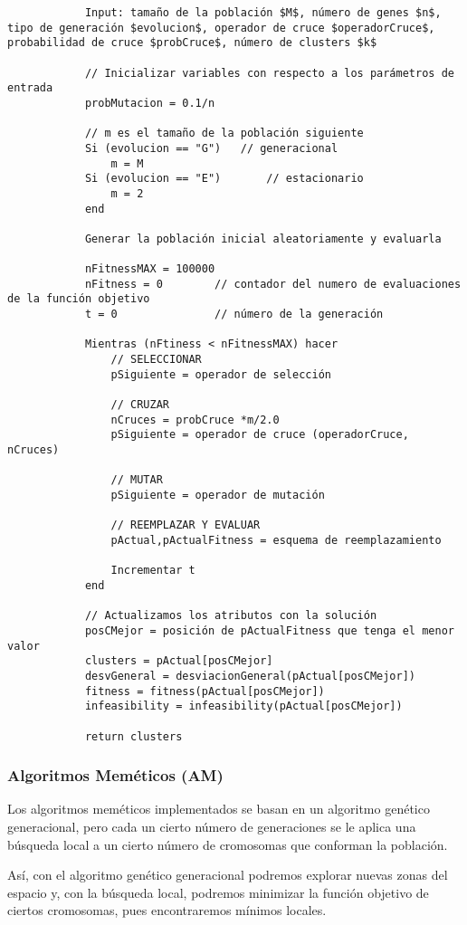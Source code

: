 		\footnotesize 
		\begin{lstlisting}
			Input: tamaño de la población $M$, número de genes $n$, tipo de generación $evolucion$, operador de cruce $operadorCruce$, probabilidad de cruce $probCruce$, número de clusters $k$

			// Inicializar variables con respecto a los parámetros de entrada
			probMutacion = 0.1/n

			// m es el tamaño de la población siguiente
			Si (evolucion == "G")	// generacional
				m = M				
			Si (evolucion == "E")		// estacionario
				m = 2
			end 

			Generar la población inicial aleatoriamente y evaluarla

			nFitnessMAX = 100000
			nFitness = 0		// contador del numero de evaluaciones de la función objetivo 
			t = 0				// número de la generación
			
			Mientras (nFtiness < nFitnessMAX) hacer 
				// SELECCIONAR
				pSiguiente = operador de selección

				// CRUZAR 
				nCruces = probCruce *m/2.0
				pSiguiente = operador de cruce (operadorCruce, nCruces)

				// MUTAR 
				pSiguiente = operador de mutación

				// REEMPLAZAR Y EVALUAR
				pActual,pActualFitness = esquema de reemplazamiento

				Incrementar t
			end

			// Actualizamos los atributos con la solución
			posCMejor = posición de pActualFitness que tenga el menor valor
			clusters = pActual[posCMejor]
			desvGeneral = desviacionGeneral(pActual[posCMejor])
			fitness = fitness(pActual[posCMejor])
			infeasibility = infeasibility(pActual[posCMejor])

			return clusters
		\end{lstlisting}
		\normalsize

		\subsubsection{Algoritmos Meméticos (AM)}
		$ $\\
		Los algoritmos meméticos implementados se basan en un algoritmo genético generacional, pero cada un cierto número de generaciones 
		se le aplica una búsqueda local a un cierto número de cromosomas que conforman la población.

		Así, con el algoritmo genético generacional podremos explorar nuevas zonas del espacio y, con la búsqueda local, podremos minimizar la función objetivo 
		de ciertos cromosomas, pues encontraremos mínimos locales.
		
